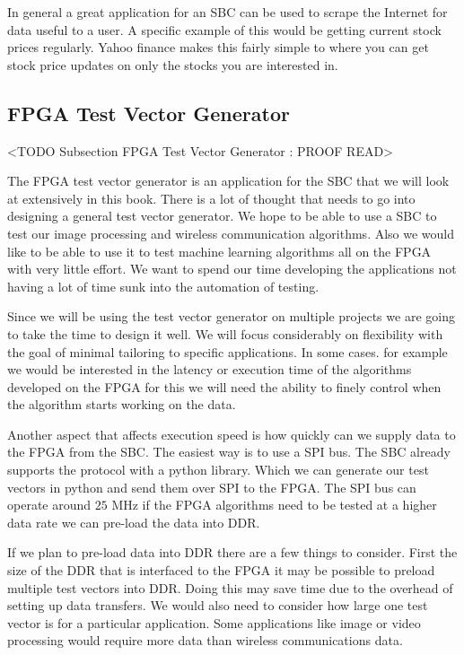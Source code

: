 In general a great application for an \ac{SBC} can be used to scrape the Internet for data useful to a user. A specific example of this would be getting current stock prices regularly. Yahoo finance makes this fairly simple to where you can get stock price updates on only the stocks you are interested in. 
	
	
\subsection{FPGA Test Vector Generator}
	<TODO Subsection FPGA Test Vector Generator : PROOF READ>

The \ac{FPGA} test vector generator is an application for the \ac{SBC} that we will look at extensively in this book. There is a lot of thought that needs to go into designing a general test vector generator. We hope to be able to use a \ac{SBC} to test our image processing and wireless communication algorithms. Also we would like to be able to use it to test machine learning algorithms all on the \ac{FPGA} with very little effort. We want to spend our time developing the applications not having a lot of time sunk into the automation of testing.

Since we will be using the test vector generator on multiple projects we are going to take the time to design it well. We will focus considerably on flexibility with the goal of minimal tailoring to specific applications. In some cases. for example we would be interested in the latency or execution time of the algorithms developed on the \ac{FPGA} for this we will need the ability to finely control when the algorithm starts working on the data. 

Another aspect that affects execution speed is how quickly can we supply data to the \ac{FPGA} from the \ac{SBC}. The easiest way is to use a \ac{SPI} bus. The \ac{SBC} already supports the protocol with a python library. Which we can generate our test vectors in python and send them over \ac{SPI} to the \ac{FPGA}. The \ac{SPI} bus can operate around $25$ \ac{MHz} if the \ac{FPGA} algorithms need to be tested at a higher data rate we can pre-load the data into \ac{DDR}. 

If we plan to pre-load data into \ac{DDR} there are a few things to consider. First the size of the \ac{DDR} that is interfaced to the \ac{FPGA} it may be possible to preload multiple test vectors into \ac{DDR}. Doing this may save time due to the overhead of setting up data transfers. We would also need to consider how large one test vector is for a particular application. Some applications like image or video processing would require more data than wireless communications data.

